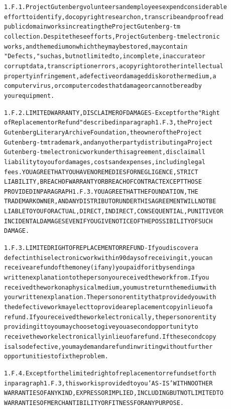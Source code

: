 \documentclass[12pt]{book}[2005/09/16]
\newenvironment{PGtext}{%
\begin{alltt}
\fontsize{8.1}{10}\ttfamily\selectfont}%
{\end{alltt}}
\renewcommand{\(}{{\upshape(}}
\renewcommand{\)}{{\upshape)}}
\begin{document}
\begin{PGtext}
1.F.1.  Project Gutenberg volunteers and employees expend considerable
effort to identify, do copyright research on, transcribe and proofread
public domain works in creating the Project Gutenberg-tm
collection.  Despite these efforts, Project Gutenberg-tm electronic
works, and the medium on which they may be stored, may contain
"Defects," such as, but not limited to, incomplete, inaccurate or
corrupt data, transcription errors, a copyright or other intellectual
property infringement, a defective or damaged disk or other medium, a
computer virus, or computer codes that damage or cannot be read by
your equipment.

1.F.2.  LIMITED WARRANTY, DISCLAIMER OF DAMAGES - Except for the "Right
of Replacement or Refund" described in paragraph 1.F.3, the Project
Gutenberg Literary Archive Foundation, the owner of the Project
Gutenberg-tm trademark, and any other party distributing a Project
Gutenberg-tm electronic work under this agreement, disclaim all
liability to you for damages, costs and expenses, including legal
fees.  YOU AGREE THAT YOU HAVE NO REMEDIES FOR NEGLIGENCE, STRICT
LIABILITY, BREACH OF WARRANTY OR BREACH OF CONTRACT EXCEPT THOSE
PROVIDED IN PARAGRAPH 1.F.3.  YOU AGREE THAT THE FOUNDATION, THE
TRADEMARK OWNER, AND ANY DISTRIBUTOR UNDER THIS AGREEMENT WILL NOT BE
LIABLE TO YOU FOR ACTUAL, DIRECT, INDIRECT, CONSEQUENTIAL, PUNITIVE OR
INCIDENTAL DAMAGES EVEN IF YOU GIVE NOTICE OF THE POSSIBILITY OF SUCH
DAMAGE.

1.F.3.  LIMITED RIGHT OF REPLACEMENT OR REFUND - If you discover a
defect in this electronic work within 90 days of receiving it, you can
receive a refund of the money (if any) you paid for it by sending a
written explanation to the person you received the work from.  If you
received the work on a physical medium, you must return the medium with
your written explanation.  The person or entity that provided you with
the defective work may elect to provide a replacement copy in lieu of a
refund.  If you received the work electronically, the person or entity
providing it to you may choose to give you a second opportunity to
receive the work electronically in lieu of a refund.  If the second copy
is also defective, you may demand a refund in writing without further
opportunities to fix the problem.

1.F.4.  Except for the limited right of replacement or refund set forth
in paragraph 1.F.3, this work is provided to you 'AS-IS' WITH NO OTHER
WARRANTIES OF ANY KIND, EXPRESS OR IMPLIED, INCLUDING BUT NOT LIMITED TO
WARRANTIES OF MERCHANTIBILITY OR FITNESS FOR ANY PURPOSE.


\end{PGtext}
\end{document}
